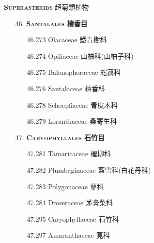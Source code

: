 \vspace{2ex} 
\noindent \normalsize\textsc{\textbf{Superasterids} 超菊類植物}\selectfont \\
\footnotesize\selectfont
\begin{enumerate}
  \item[46. ] \textbf{\textsc{Santalales} 檀香目}   
    \begin{enumerate}
      \item[46.273] Olacaceae 鐵青樹科     
        
      \item[46.274] Opiliaceae 山柚科(山柚子科)     
        
      \item[46.275] Balanophoraceae 蛇菰科     
        
      \item[46.276] Santalaceae 檀香科     
        
      \item[46.278] Schoepfiaceae 青皮木科     
        
      \item[46.279] Loranthaceae 桑寄生科     
        
    \end{enumerate}
  \item[47. ] \textbf{\textsc{Caryophyllales} 石竹目}   
    \begin{enumerate}
      \item[47.281] Tamaricaceae 檉柳科     
        
      \item[47.282] Plumbaginaceae 藍雪科(白花丹科)     
        
      \item[47.283] Polygonaceae 蓼科     
        
      \item[47.284] Droseraceae 茅膏菜科     
        
      \item[47.295] Caryophyllaceae 石竹科     
        
      \item[47.297] Amaranthaceae 莧科     

\end{enumerate}
\end{enumerate}
